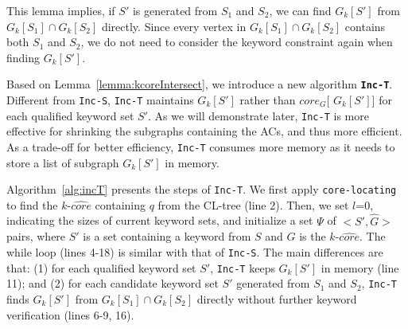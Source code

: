 This lemma implies, if $S'$ is generated from $S_1$ and $S_2$,
we can find $G_k[S']$ from $G_k[S_1]\cap G_k[S_2]$ directly.
Since every vertex in $G_k[S_1]\cap G_k[S_2]$ contains both $S_1$ and $S_2$,
we do not need to consider the keyword constraint again when finding $G_k[S']$.

Based on Lemma~\ref{lemma:kcoreIntersect}, we introduce a new algorithm \textbf{{\tt Inc-T}}. Different from {\tt Inc-S}, {\tt Inc-T} maintains $G_k[S']$ rather than $core_G[$ $G_k[S']]$ for each qualified keyword set $S'$. As we will demonstrate later, {\tt Inc-T} is more effective for shrinking the subgraphs containing the ACs, and thus more efficient. As a trade-off for better efficiency, {\tt Inc-T} consumes more memory as it needs to store a list of subgraph $G_k[S']$ in memory.

Algorithm~\ref{alg:incT} presents the steps of {\tt Inc-T}.
We first apply {\tt core-locating} to find the $k$-$\widehat{core}$ containing $q$ from the CL-tree (line 2).
Then, we set $l$=0, indicating the sizes of current keyword sets,
and initialize a set $\Psi$ of $<S',\widehat G>$ pairs,
where $S'$ is a set containing a keyword from $S$ and $\widehat G$ is the $k$-$\widehat {core}$.
The while loop (lines 4-18) is similar with that of {\tt Inc-S}.
The main differences are that:
(1) for each qualified keyword set $S'$, {\tt Inc-T} keeps $G_k[S']$ in memory (line 11);
and (2) for each candidate keyword set $S'$ generated from $S_1$ and $S_2$,
{\tt Inc-T} finds $G_k[S']$ from $G_k[S_1]\cap G_k[S_2]$ directly without further keyword verification (lines 6-9, 16).


